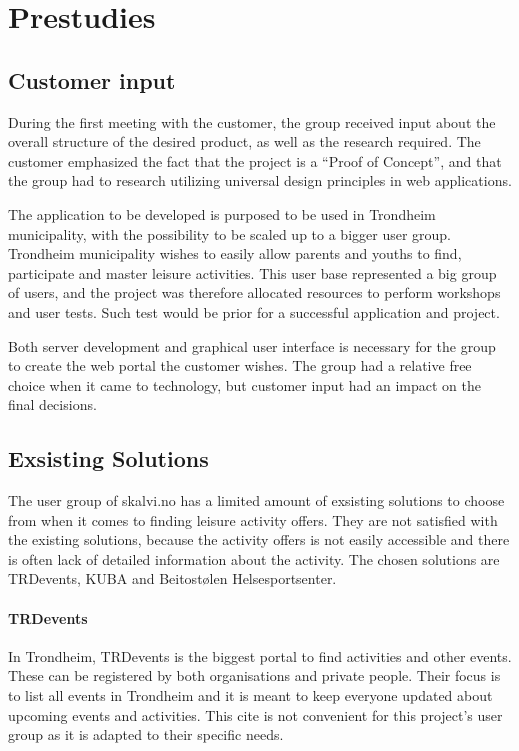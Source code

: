 
\chapter{Prestudies}


\section{Customer input}
\label{Customer input}
During the first meeting with the customer, the group received input about the overall structure of the desired product, as well as the research required. The customer emphasized the fact that the project is a “Proof of Concept”, and that the group had to research utilizing universal design principles in web applications.

The application to be developed is purposed to be used in Trondheim municipality, with the possibility to be scaled up to a bigger user group. Trondheim municipality wishes to easily allow parents and youths to find, participate and master leisure activities. This user base represented a big group of users, and the project was therefore allocated resources to perform workshops and user tests. Such test would be prior for a successful application and project.

Both server development and graphical user interface is necessary for the group to create the web portal the customer wishes. The group had a relative free choice when it came to technology, but customer input had an impact on the final decisions.

\section{Exsisting Solutions}
\label{alternativeSolutions}
The user group of skalvi.no has a limited amount of exsisting solutions to choose from when it comes to finding leisure activity offers. They are not satisfied with the existing solutions, because the activity offers is not easily accessible and there is often lack of detailed information about the activity.  
The chosen solutions are TRDevents, KUBA and Beitostølen Helsesportsenter. 

\subsubsection{TRDevents}
In Trondheim, TRDevents \cite{TRDevents} is the biggest portal to find activities and other events. These can be registered by both organisations and private people. Their focus is to list all events in Trondheim and it is meant to keep everyone updated about upcoming events and activities. This cite is not convenient for this project's user group as it is adapted to their specific needs.

